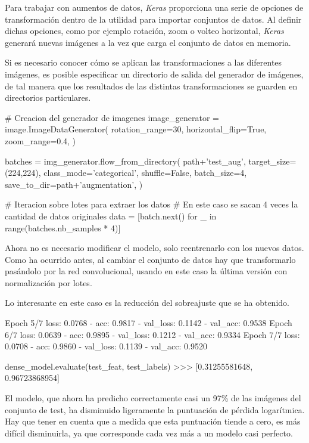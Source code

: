 Para trabajar con aumentos de datos, \textit{Keras} proporciona una serie de
opciones de transformación dentro de la utilidad para importar conjuntos de
datos. Al definir dichas opciones, como por ejemplo rotación, zoom o volteo
horizontal, \textit{Keras} generará nuevas imágenes a la vez que carga el
conjunto de datos en memoria.

Si es necesario conocer cómo se aplican las transformaciones a las diferentes imágenes, es posible especificar un directorio de salida del generador de imágenes, de tal manera que los resultados de las distintas transformaciones se guarden en directorios particulares.

\begin{python}
# Creacion del generador de imagenes
image_generator = image.ImageDataGenerator(
    rotation_range=30,
    horizontal_flip=True,
    zoom_range=0.4,
)

batches = img_generator.flow_from_directory(
    path+'test_aug',
    target_size=(224,224),
    class_mode='categorical',
    shuffle=False,
    batch_size=4,
    save_to_dir=path+'augmentation',
)

# Iteracion sobre lotes para extraer los datos
# En este caso se sacan 4 veces la cantidad de datos originales
data = [batch.next() for _ in range(batches.nb_samples * 4)]
\end{python}

Ahora no es necesario modificar el modelo, solo reentrenarlo con los nuevos datos. Como ha ocurrido antes, al cambiar el conjunto de datos hay que transformarlo pasándolo por la red convolucional, usando en este caso la última versión con normalización por lotes.

Lo interesante en este caso es la reducción del sobreajuste que se ha obtenido.

\begin{python}
Epoch 5/7
loss: 0.0768 - acc: 0.9817 - val_loss: 0.1142 - val_acc: 0.9538
Epoch 6/7
loss: 0.0639 - acc: 0.9895 - val_loss: 0.1212 - val_acc: 0.9334
Epoch 7/7
loss: 0.0708 - acc: 0.9860 - val_loss: 0.1139 - val_acc: 0.9520

dense_model.evaluate(test_feat, test_labels)
>>> [0.31255581648, 0.96723868954]
\end{python}

El modelo, que ahora ha predicho correctamente casi un 97\% de las imágenes del conjunto de test, ha disminuido ligeramente la puntuación de pérdida logarítmica. Hay que tener en cuenta que a medida que esta puntuación tiende a cero, es más difícil disminuirla, ya que corresponde cada vez más a un modelo casi perfecto.

